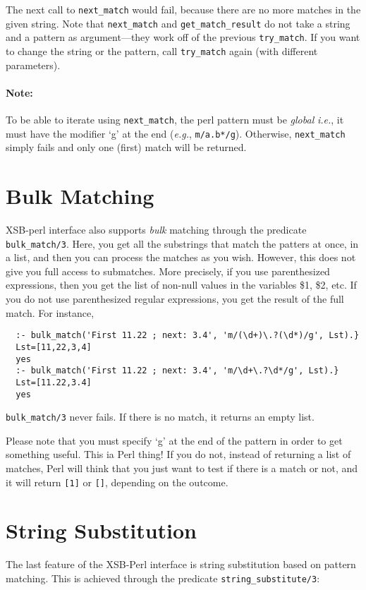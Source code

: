 The next call to {\tt next\_match}  would fail, because there are no more
matches in the given string. Note that {\tt next\_match} and
{\tt get\_match\_result} do not take a string and a pattern as
argument---they work off of the previous {\tt try\_match}. If you want to
change the string or the pattern, call {\tt try\_match} again (with
different parameters).

\paragraph{Note:} To be able to iterate using {\tt next\_match}, the perl
pattern must be \emph{global} {\it i.e.}, it must have the modifier `g' at
the end ({\it e.g.}, {\tt m/a.b*/g}). Otherwise, {\tt next\_match} simply
fails and only one (first) match will be returned.  

\section{Bulk Matching}
XSB-perl interface also supports {\em bulk\/} matching through the
predicate {\tt bulk\_match/3}. Here, you get all
the substrings that match the patters at once, in a list, and then you can
process the matches as you wish. However, this does not give you full
access to submatches. More precisely, if you use parenthesized expressions,
then you get the list of non-null values in the variables \$1, \$2, etc.
If you do not use parenthesized regular expressions, you get the result of
the full match. For instance,
\begin{verbatim}
  :- bulk_match('First 11.22 ; next: 3.4', 'm/(\d+)\.?(\d*)/g', Lst).}
  Lst=[11,22,3,4]
  yes
  :- bulk_match('First 11.22 ; next: 3.4', 'm/\d+\.?\d*/g', Lst).}
  Lst=[11.22,3.4]
  yes
\end{verbatim}
{\tt bulk\_match/3} never fails. If there is no match, it returns an empty
list. 

Please note that you must specify `g' at the end of the pattern in order to
get something useful. This ia Perl thing! If you do not, instead of
returning a list of matches, Perl will think that you just want to test if
there is a match or not, and it will return \verb|[1]| or \verb|[]|,
depending on the outcome.

\section{String Substitution}
The last feature of the XSB-Perl interface is string substitution based on
pattern matching. This is achieved through the predicate
{\tt string\_substitute/3}: 

